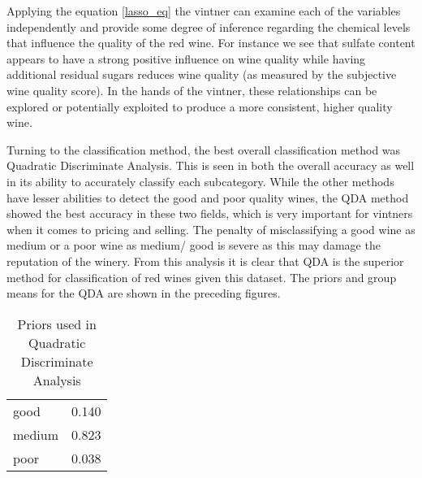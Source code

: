 \documentclass[]{article}
\begin{document}
Applying the equation \ref{lasso_eq} the vintner can examine each of the
variables independently and provide some degree of inference regarding
the chemical levels that influence the quality of the red wine. For
instance we see that sulfate content appears to have a strong positive
influence on wine quality while having additional residual sugars
reduces wine quality (as measured by the subjective wine quality score).
In the hands of the vintner, these relationships can be explored or
potentially exploited to produce a more consistent, higher quality wine.
\linebreak

Turning to the classification method, the best overall classification
method was Quadratic Discriminate Analysis. This is seen in both the
overall accuracy as well in its ability to accurately classify each
subcategory. While the other methods have lesser abilities to detect the
good and poor quality wines, the QDA method showed the best accuracy in
these two fields, which is very important for vintners when it comes to
pricing and selling. The penalty of misclassifying a good wine as medium
or a poor wine as medium/ good is severe as this may damage the
reputation of the winery. From this analysis it is clear that QDA is the
superior method for classification of red wines given this dataset. The
priors and group means for the QDA are shown in the preceding figures.

\begin{longtable}[]{@{}lr@{}}
\caption{Priors used in Quadratic Discriminate Analysis}\tabularnewline
\toprule
good & 0.140\tabularnewline
medium & 0.823\tabularnewline
poor & 0.038\tabularnewline
\bottomrule
\end{longtable}
\end{document}

